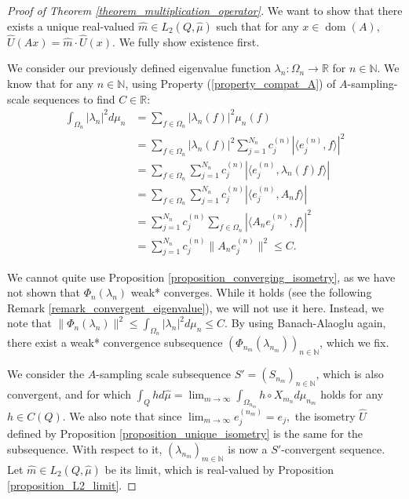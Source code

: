 \documentclass[10pt,a4paper]{amsart}
\def \Dom{\operatorname{dom}}
\def \HMU{\hat{\mu}}
\def \HU{\hat{U}}
\def \Hm{\hat{m}}
\def \LL{\langle}
\def \RR{\rangle}
\begin{document}
\begin{proof}[Proof of Theorem \ref{theorem_multiplication_operator}]
	We want to show that there exists a unique real-valued $\Hm\in L_2(Q,\HMU)$ such that for any $x\in\Dom(A)$, $\HU(Ax)=\Hm\cdot\HU(x).$ We fully show existence first. 
	
	We consider our previously defined eigenvalue function $\lambda_n:\Omega_n\rightarrow\mathbb{R}$ for $n\in\mathbb{N}$. We know that for any $n\in\mathbb{N}$, using Property (\ref{property_compat_A}) of $A$-sampling-scale sequences to find $C\in\mathbb{R}$:
	\begin{align*}
		\int_{\Omega_n}|\lambda_n|^2d\mu_n&=\sum_{f\in\Omega_n}|\lambda_n(f)|^2\mu_n(f)\\
		&=\sum_{f\in\Omega_n}|\lambda_n(f)|^2\sum_{j=1}^{N_n}c_j^{(n)}|\LL e_j^{(n)},f\RR|^2\\
		&=\sum_{f\in\Omega_n}\sum_{j=1}^{N_n}c_j^{(n)}|\LL e_j^{(n)},\lambda_n(f)f\RR|\\
		&=\sum_{f\in\Omega_n}\sum_{j=1}^{N_n}c_j^{(n)}|\LL e_j^{(n)},A_nf\RR|\\
		&=\sum_{j=1}^{N_n}c_j^{(n)}\sum_{f\in\Omega_n}|\LL A_n e_j^{(n)}, f\RR|^2\\
		&=\sum_{j=1}^{N_n}c_j^{(n)}\|A_ne_j^{(n)}\|^2\leq C.
	\end{align*}
	
	We cannot quite use Proposition \ref{proposition_converging_isometry}, as we have not shown that $\Phi_n(\lambda_n)$ weak* converges. While it holds (see the following Remark \ref{remark_convergent_eigenvalue}), we will not use it here. Instead, we note that $\|\Phi_n(\lambda_n)\|^2\leq\int_{\Omega_n}|\lambda_n|^2d\mu_n\leq C$. By using Banach-Alaoglu again, there exist a weak* convergence subsequence $(\Phi_{n_m}(\lambda_{n_m}))_{n\in\mathbb{N}}$, which we fix.
	
	We consider the $A$-sampling scale subsequence $S'=(S_{n_m})_{n\in\mathbb{N}}$, which is also convergent, and for which $\int_{Q} hd\HMU=\lim_{m\rightarrow\infty}\int_{\Omega_{n_m}}h\circ X_{m_n}d\mu_{n_m}$ holds for any $h\in C(Q)$. We also note that since $\lim_{m\rightarrow\infty}e_j^{(n_m)}=e_j,$ the isometry $\HU$ defined by Proposition \ref{proposition_unique_isometry} is the same for the subsequence.  With respect to it, $(\lambda_{n_m})_{m\in\mathbb{N}}$ is now a $S'$-convergent sequence. Let $\hat{m}\in L_2(Q,\HMU)$ be its limit, which is real-valued by Proposition \ref{proposition_L2_limit}. 
	

\end{proof}
\end{document}
